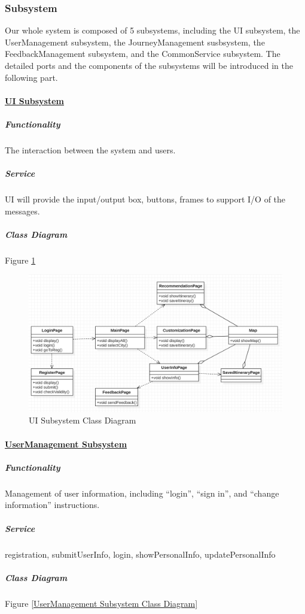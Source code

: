 \documentclass[10pt]{article}
\begin{document}
\subsubsection{Subsystem}
Our whole system is composed of 5 subsystems, including the UI subsystem, the UserManagement subsystem, the JourneyManagement susbsystem, the FeedbackManagement subsystem, and the CommonService subsystem. The detailed ports and the components of the subsystems will be introduced in the following part.

\paragraph{\underline{UI Subsystem}}
\subparagraph{Functionality} The interaction between the system and users.

\subparagraph{Service} UI will provide the input/output box, buttons, frames to support I/O of the messages.

\subparagraph{Class Diagram} Figure \ref{UI Subsystem Class Diagram}
\begin{figure}[H]
	\centering
	
	\includegraphics[width=14cm]{uiclass.png}
	\caption{UI Subsystem Class Diagram}
	\label{UI Subsystem Class Diagram}
\end{figure}

\paragraph{\underline{UserManagement Subsystem}}
\subparagraph{Functionality} Management of user information, including “login”, “sign in”, and “change information” instructions.

\subparagraph{Service}  registration, submitUserInfo, login, showPersonalInfo, updatePersonalInfo

\subparagraph{Class Diagram} Figure \ref{UserManagement Subsystem Class Diagram}
\end{document}
